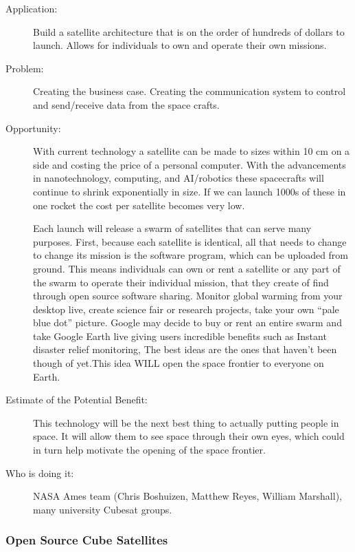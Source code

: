 \begin{description}
\item[Application:] Build a satellite architecture that is on the order of hundreds of dollars to launch. Allows for individuals to own and operate their own missions.

\item[Problem:] Creating the business case. Creating the communication system to control and send/receive data from the space crafts.

\item[Opportunity:] With current technology a satellite can be made to sizes within 10 cm on a side and costing the price of a personal computer. With the advancements in nanotechnology, computing, and AI/robotics these spacecrafts will continue to shrink exponentially in size. If we can launch 1000s of these in one rocket the cost per satellite becomes very low.

Each launch will release a swarm of satellites that can serve many purposes. First, because each satellite is identical, all that needs to change to change its mission is the software program, which can be uploaded from ground. This means individuals can own or rent a satellite or any part of the swarm to operate their individual mission, that they create of find through open source software sharing. Monitor global warming from your desktop live, create science fair or research projects, take your own ``pale blue dot'' picture. Google may decide to buy or rent an entire swarm and take Google Earth live giving users incredible benefits such as Instant disaster relief monitoring, The best ideas are the ones that haven't been though of yet.This idea WILL open the space frontier to everyone on Earth.

\item[Estimate of the Potential Benefit:] This technology will be the next best thing to actually putting people in space. It will allow them to see space through their own eyes, which could in turn help motivate the opening of the space frontier.

\item[Who is doing it:] NASA Ames team (Chris Boshuizen, Matthew Reyes, William Marshall), many university Cubesat groups.
\end{description}

\subsubsection{Open Source Cube Satellites}

